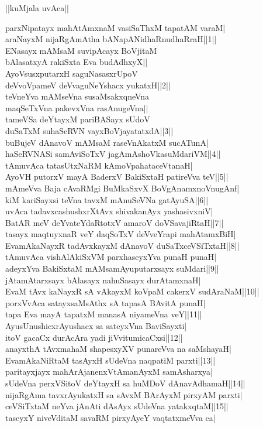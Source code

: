 \documentclass{article}
\begin{document}
\begin{center}
||kuMjala uvAca||
\end{center}

parxNipatayx mahAtAmxnaM vasiSaThxM tapatAM varaM|\\
araNayxM nijaRgAmAtha bANapANidhaRnudhaRraH||1||\\
ENasayx mAMsaM suvipAcayx BoVjitaM\\
bAlasatxyA rakiSxta Eva budAdhxyX||\\
AyoVsusxputarxH saguNasasxrUpoV\\
deVvoVpameV deVvaguNeYshacx yukatxH||2||\\
teVneYva mAMseVna susaMsakxqneVna\\
maqSeTxVna pakevxVna rasAnugeVna||\\
tameVSa deYtayxM pariBASayx sUdoV\\
duSaTxM suhaSeRVN vayxBoVjayatatxdA||3||\\
buBujeV dAnavoV mAMsaM raseVnAkatxM sucATunA|\\
haSeRVNASi samAviSoTxV jagAmAshoVkasuMdariVM||4||\\
tAmuvAca tatasUtxNaRM kAmoVpahataceVtanaH|\\
AyoVH putorxV mayA BaderxV BakiSxtaH patireVva teV||5||\\
mAmeVva Baja cAvaRMgi BuMkaSxvX BoVgAnamxnoVnugAnf|\\
kiM kariSayxsi teVna tavxM mAnuSeVNa gatAyuSA||6||\\
uvAca tadavxcashushxrXtAvx shivakanAyx yashasivxniV|\\
BatAR meV deYvateYdaRtotxV amaroV doVSavajiRtaH||7||\\
tasayx maqtuyxnaR veY daqSoTxV deVveYrapi mahAtamxBiH|\\
EvamAkaNayxR tadAvxkayxM dAnavoV duSaTxceVSiTxtaH||8||\\
tAmuvAca vishAlAkiSxVM parxhaseyxYva punaH punaH|\\
adeyxYva BakiSxtaM mAMsamAyuputarxsayx suMdari||9||\\
jAtamAtarxsayx bAlasayx nahuSasayx durAtamxnaH|\\
EvaM tAvx kaNayxR sA vAkayxM koVpaM cakerxV sudAraNaM||10||\\
porxVvAca satayxsaMsAthx sA tapasA BAvitA punaH|\\
tapa Eva mayA tapatxM manasA niyameVna veY||11||\\
AyusUnushicxrAyushacx sa sateyxVna BaviSayxti|\\
itoV gacaCx durAcAra yadi jiVvitumicaCxsi||12||\\
anayxthA tAvxmahaM shapesxyXV punareVva na saMshayaH|\\
EvamAkaNiRtaM tasAyxH sUdeVna naqpatiM parxti||13||\\
paritayxjayx mahArAjanenxVtAmanAyxM samAsharxya|\\
sUdeVna perxVSitoV deYtayxH sa huMDoV dAnavAdhamaH||14||\\
nijaRgAma tavxrAyukatxH sa sAvxM BArAyxM pirxyAM parxti|\\
ceVSiTxtaM neYva jAnAti dAsAyx sUdeVna yatakxqtaM||15||\\
taseyxY niveVditaM savaRM pirxyAyeY vaqtatxmeVva ca|\\
\end{document}
